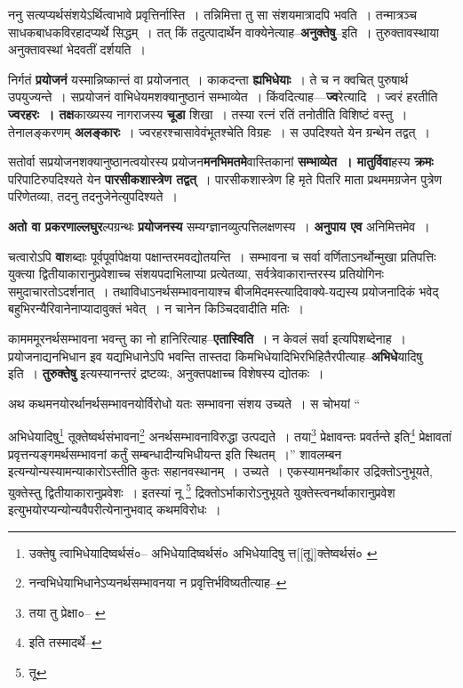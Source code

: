 \documentclass[article,12pt,a4paper]{memoir}
\begin{document}
	  \pstart ननु सत्यप्यर्थसंशयेऽर्थित्वाभावे प्रवृत्तिर्नास्ति । तन्निमित्ता तु सा संशयमात्रादपि भवति । तन्मात्रञ्च साधकबाधकविरहादप्यर्थे सिद्धम् । तत् किं तदुत्पादार्थेन वाक्येनेत्याह--\textbf{अनुक्तेषु}--इति । तुरुक्तावस्थाया अनुक्तावस्थां भेदवतीं दर्शयति ।
	\pend
      

	  \pstart निर्गतं \textbf{प्रयोजनं} यस्मान्निष्कान्तं वा प्रयोजनात् । काकदन्ता \textbf{ह्यभिधेयाः} । ते च न क्वचित् पुरुषार्थ उपयुज्यन्ते । सप्रयोजनं वाभिधेयमशक्यानुष्ठानं सम्भाव्येत । किंवदित्याह—\textbf{ज्व}रेत्यादि । ज्वरं हरतीति \textbf{ज्वरहरः । तक्ष}काख्यस्य नागराजस्य \textbf{चूडा} शिखा । तस्या रत्नं रतिं तनोतीति विशिष्टं वस्तु । तेनालङ्करणम् \textbf{अलङ्कारः} । ज्वरहरश्चासावेवंभूतश्चेति विग्रहः । स उपदिश्यते येन ग्रन्थेन तद्वत् ।
	\pend
      

	  \pstart सतोर्वा सप्रयोजनशक्यानुष्ठानत्वयोरस्य प्रयोजन\textbf{मनभिमतमे}वास्तिकानां \textbf{सम्भाव्येत । मातुर्विवा}हस्य \textbf{क्रमः} परिपाटिरुपदिश्यते येन \textbf{पारसीकशास्त्रेण तद्वत्} । पारसीकशास्त्रेण हि मृते पितरि माता प्रथममग्रजेन पुत्रेण परिणेतव्या, तदनु तदनुजेनेत्युपदिश्यते ।
	\pend
      

	  \pstart \textbf{अतो वा प्रकरणाल्लघुर}ल्पग्रन्थः \textbf{प्रयोजनस्य} सम्यग्ज्ञानव्युत्पत्तिलक्षणस्य । \textbf{अनुपाय एव} अनिमित्तमेव ।
	\pend
      

	  \pstart चत्वारोऽपि \textbf{वा}शब्दाः पूर्वपूर्वापेक्षया पक्षान्तरमवद्योतयन्ति । सम्भावना च सर्वा वर्णिताऽनर्थोन्मुखा प्रतिपत्तिः युक्त्या द्वितीयाकारानुप्रवेशाच्च संशयपदाभिलाप्या प्रत्येतव्या, सर्वत्रेवाकारान्तरस्य प्रतियोगिनः समुदाचारतोऽदर्शनात् । तथाविधाऽनर्थसम्भावनायाश्च बीजमिदमस्त्यादिवाक्ये-यद्यस्य प्रयोजनादिकं भवेद् बहुभिरन्यैरिवानेनाप्यादावुक्तं भवेत् । न चानेन किञ्चिदवादीति मतिः ।
	\pend
      

	  \pstart कामममूरनर्थसम्भावना भवन्तु का नो हानिरित्याह--\textbf{एतास्विति} । न केवलं सर्वा इत्यपिशब्देनाह । प्रयोजनाद्यनभिधान इव यद्यभिधानेऽपि भवन्ति तास्तदा किमभिधेयादिभिरभिहितैरपीत्याह--\textbf{अभिधे}यादिषु इति । \textbf{तुरुक्तेषु} इत्यस्यानन्तरं द्रष्टव्यः, अनुक्तपक्षाच्च विशेषस्य द्योतकः ।
	\pend
      

	  \pstart अथ कथमनयोरर्थानर्थसम्भावनयोर्विरोधो यतः सम्भावना संशय उच्यते । स चोभयां \leavevmode{} “
	  
	अभिधेयादिषु\footnote{उक्तेषु त्वाभिधेयादिष्वर्थसं०--\cite{dp-edE} अभिधेयादिष्वर्थसं० \cite{dp-edH} \cite{dp-edP} अभिधेयादिषु त्त[[तू]]क्तेष्वर्थसं० \cite{dp-msB}} तूक्तेष्वर्थसंभावना\footnote{नन्वभिधेयाभिधानेऽप्यनर्थसम्भावनया न प्रवृत्तिर्भविष्यतीत्याह--\cite{dp-msD-n}} अनर्थसम्भावनाविरुद्धा उत्पद्यते । तया\footnote{तया तु प्रेक्षा०--\cite{dp-msA} \cite{dp-edP} \cite{dp-edH} \cite{dp-edN}} प्रेक्षावन्तः प्रवर्तन्ते इति\footnote{इति तस्मादर्थे--\cite{dp-msD-n}} प्रेक्षावतां प्रवृत्तन्यङ्गमर्थसम्भावनां कर्तुं सम्बन्धादीन्यभिधीयन्त इति स्थितम् ।” शावलम्बन इत्यन्योन्यस्यामन्याकारोऽस्तीति कुतः सहानवस्थानम् । उच्यते । एकस्यामनर्थांकार उद्रिक्तोऽनुभूयते, युक्तेस्तु द्वितीयाकारानुप्रवेशः । इतस्यां नू \footnote{तू} द्रिक्तोऽ\leavevmode{}र्भाकारोऽनुभूयते युक्तेस्त्वनर्थाकारानुप्रवेश इत्युभयोरप्यन्योन्यवैपरीत्येनानुभवाद् कथमविरोधः ।
	\pend
      
\end{document}
